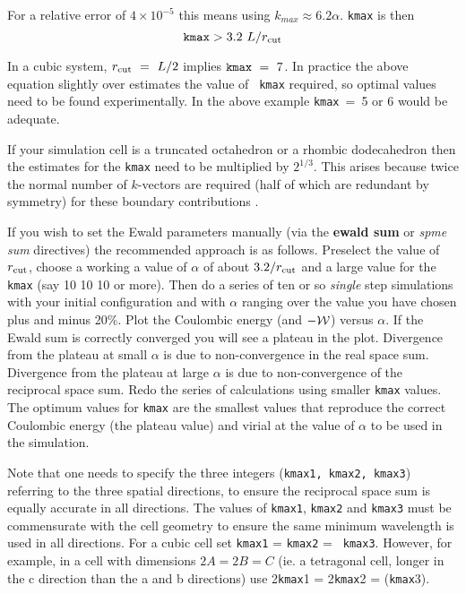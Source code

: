 For a relative error of $4\times 10^{-5}$ this means using $k_{max}
\approx 6.2 \alpha$.  {\tt kmax} is then
\begin{equation}
{\tt kmax} > 3.2~L/r_{\rm cut}
\end {equation}

In a cubic system, $r_{\rm cut}~=~L/2$ implies ${\tt kmax}~=~7$.  In
practice the above equation slightly over estimates the value of {\tt
kmax} required, so optimal values need to be found experimentally.  In
the above example {\tt kmax}~=~5 or 6 would be adequate.

If your simulation cell is a truncated octahedron or a rhombic
dodecahedron then the estimates for the {\tt kmax} need to be
multiplied by $2^{1/3}$. This arises because twice the normal number
of $k$-vectors are required (half of which are redundant by symmetry)
for these boundary contributions \cite{smith-93b}.

If you wish to set the Ewald parameters manually (via the {\bf ewald
sum} or {\em spme sum} directives) the recommended approach is as follows. Preselect the
value of $r_{\rm cut}$, choose a working a value of $\alpha$ of about
$3.2/r_{\rm cut}$ and a large value for the {\tt kmax} (say 10 10 10
or more).  Then do a series of ten or so {\em single} step simulations
with your initial configuration and with $\alpha$ ranging over the
value you have chosen plus and minus 20\%. Plot the Coulombic energy
(and $-{\cal W}$) versus $\alpha$. If the Ewald sum is correctly
converged you will see a plateau in the plot.  Divergence from the
plateau at small $\alpha$ is due to non-convergence in the real space
sum. Divergence from the plateau at large $\alpha$ is due to
non-convergence of the reciprocal space sum.  Redo the series of
calculations using smaller {\tt kmax} values. The optimum values for
{\tt kmax} are the smallest values that reproduce the correct
Coulombic energy (the plateau value) and virial at the value of
$\alpha$ to be used in the simulation.

Note that one needs to specify the three integers ({\tt kmax1, kmax2,
kmax3}) referring to the three spatial directions, to ensure the
reciprocal space sum is equally accurate in all directions. The values
of {\tt kmax1}, {\tt kmax2} and {\tt kmax3} must be commensurate with
the cell geometry to ensure the same minimum wavelength is used in all
directions.  For a cubic cell set {\tt kmax1} = {\tt kmax2} = {\tt
kmax3}.  However, for example, in a cell with dimensions $2A = 2B = C$
(ie. a tetragonal cell, longer in the c direction than the a and b
directions) use 2{\tt kmax}1 = 2{\tt kmax}2 = ({\tt kmax}3).

